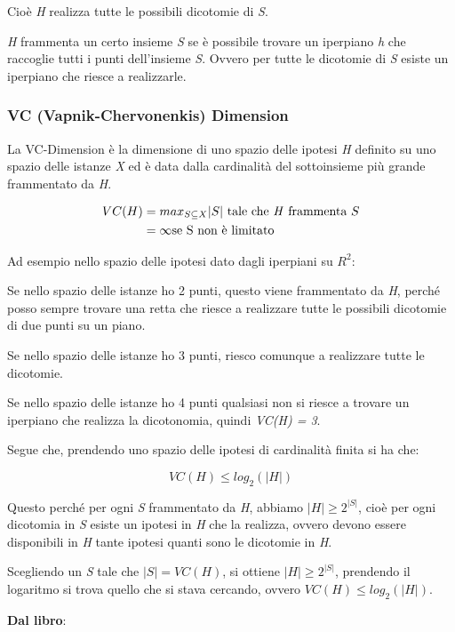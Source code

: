 Cioè \emph{H} realizza tutte le possibili dicotomie di \emph{S}.

\emph{H} frammenta un certo insieme \emph{S} se è possibile trovare un
iperpiano \emph{h} che raccoglie tutti i punti dell'insieme \emph{S}. Ovvero per
tutte le dicotomie di \emph{S} esiste un iperpiano che riesce a
realizzarle.

\subsubsection{VC (Vapnik-Chervonenkis) Dimension}\label{vc-vapnik-chervonenkis-dimension}

La VC-Dimension è la dimensione di uno spazio delle ipotesi \emph{H}
definito su uno spazio delle istanze \emph{X} ed è data dalla
cardinalità del sottoinsieme più grande frammentato da \emph{H}.

\begin{align*}
VC(H) &= max_{S \subseteq X} |S| \text{ tale che \emph{H} frammenta } S  \\
&= \infty \text{se S non è limitato}
\end{align*}


Ad esempio nello spazio delle ipotesi dato dagli iperpiani su $R^2$:

Se nello spazio delle istanze ho 2 punti, questo viene frammentato da
\emph{H}, perché posso sempre trovare una retta che riesce a realizzare
tutte le possibili dicotomie di due punti su un piano.

Se nello spazio delle istanze ho 3 punti, riesco comunque a realizzare
tutte le dicotomie.

Se nello spazio delle istanze ho 4 punti qualsiasi non si riesce a
trovare un iperpiano che realizza la dicotonomia, quindi \emph{VC(H) =
3}.

Segue che, prendendo uno spazio delle ipotesi di cardinalità finita si
ha che:

$$
VC(H) \leq log_2(|H|)
$$

Questo perché per ogni \emph{S} frammentato da \emph{H}, abbiamo
$|H| \geq 2^{|S|}$,
cioè per ogni dicotomia in \emph{S} esiste un ipotesi in \emph{H} che la
realizza, ovvero devono essere disponibili in \emph{H} tante ipotesi
quanti sono le dicotomie in \emph{H}.

Scegliendo un \emph{S} tale che $|S| = VC(H)$, si
ottiene $|H| \geq 2^{|S|}$, prendendo
il logaritmo si trova quello che si stava cercando, ovvero $VC(H) \leq log_2(|H|)$.

\textbf{Dal libro}:

